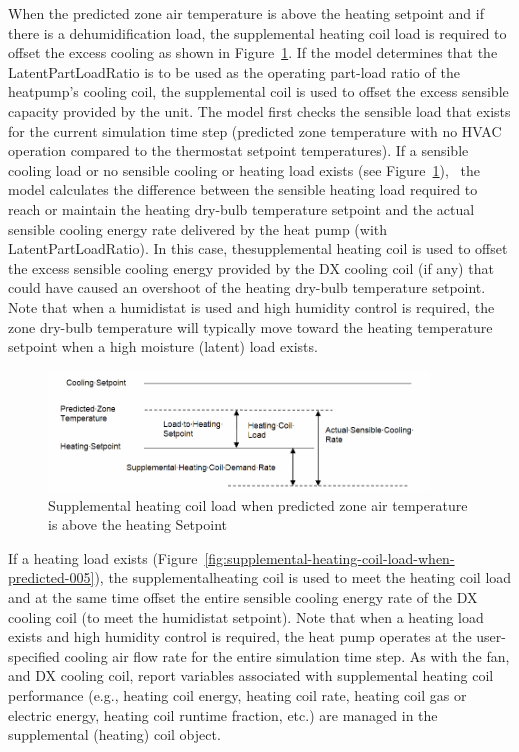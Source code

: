 When the predicted zone air temperature is above the heating setpoint and if there is a dehumidification load, the supplemental heating coil load is required to offset the excess cooling as shown in Figure~\ref{fig:supplemental-heating-coil-load-when-predicted-004}. If the model determines that the LatentPartLoadRatio is to be used as the operating part-load ratio of the heatpump's cooling coil, the supplemental coil is used to offset the excess sensible capacity provided by the unit. The model first checks the sensible load that exists for the current simulation time step (predicted zone temperature with no HVAC operation compared to the thermostat setpoint temperatures). If a sensible cooling load or no sensible cooling or heating load exists (see Figure~\ref{fig:supplemental-heating-coil-load-when-predicted-004}),~ the model calculates the difference between the sensible heating load required to reach or maintain the heating dry-bulb temperature setpoint and the actual sensible cooling energy rate delivered by the heat pump (with LatentPartLoadRatio). In this case, thesupplemental heating coil is used to offset the excess sensible cooling energy provided by the DX cooling coil (if any) that could have caused an overshoot of the heating dry-bulb temperature setpoint. Note that when a humidistat is used and high humidity control is required, the zone dry-bulb temperature will typically move toward the heating temperature setpoint when a high moisture (latent) load exists.

\begin{figure}[hbtp] %
\centering
\includegraphics[width=0.9\textwidth, height=0.9\textheight, keepaspectratio=true]{media/image5262.png}
\caption{Supplemental heating coil load when predicted zone air temperature is above the heating Setpoint \protect \label{fig:supplemental-heating-coil-load-when-predicted-004}}
\end{figure}

If a heating load exists (Figure~\ref{fig:supplemental-heating-coil-load-when-predicted-005}), the supplementalheating coil is used to meet the heating coil load and at the same time offset the entire sensible cooling energy rate of the DX cooling coil (to meet the humidistat setpoint). Note that when a heating load exists and high humidity control is required, the heat pump operates at the user-specified cooling air flow rate for the entire simulation time step. As with the fan, and DX cooling coil, report variables associated with supplemental heating coil performance (e.g., heating coil energy, heating coil rate, heating coil gas or electric energy, heating coil runtime fraction, etc.) are managed in the supplemental (heating) coil object.

